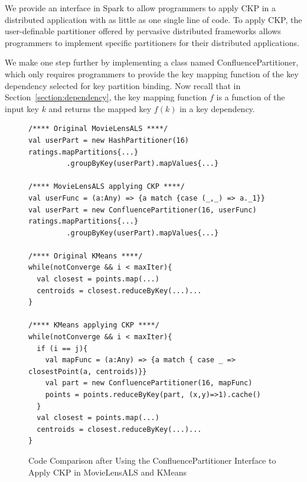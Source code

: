 \documentclass[10pt,journal,compsoc]{IEEEtran}
\makeatletter
\newcommand{\removelatexerror}{\let\@latex@error\@gobble}
\makeatother
\begin{document}
We provide an interface in Spark to allow programmers to apply CKP in a
distributed application with as little as one single line of code.
To apply CKP, the user-definable partitioner offered by pervasive distributed frameworks allows programmers to implement specific partitioners for their distributed applications. 

We make one step further by implementing a class named ConfluencePartitioner, 
which only requires programmers to provide the key mapping function 
of the key dependency selected for key partition binding. 
Now recall that in Section~\ref{section:dependency}, the key mapping function
$f$ is a function of the input key $k$ and returns the mapped key $f(k)$ in a 
key dependency.


\begin{figure}[!t]
\removelatexerror
\begin{lstlisting}
/**** Original MovieLensALS ****/
val userPart = new HashPartitioner(16)
ratings.mapPartitions{...}
         .groupByKey(userPart).mapValues{...}

/**** MovieLensALS applying CKP ****/
val userFunc = (a:Any) => {a match {case (_,_) => a._1}}
val userPart = new ConfluencePartitioner(16, userFunc)
ratings.mapPartitions{...}
         .groupByKey(userPart).mapValues{...}

/**** Original KMeans ****/
while(notConverge && i < maxIter){
  val closest = points.map(...)
  centroids = closest.reduceByKey(...)...
}

/**** KMeans applying CKP ****/
while(notConverge && i < maxIter){
  if (i == j){
    val mapFunc = (a:Any) => {a match { case _ => closestPoint(a, centroids)}}
    val part = new ConfluencePartitioner(16, mapFunc)
    points = points.reduceByKey(part, (x,y)=>1).cache()
  }
  val closest = points.map(...)
  centroids = closest.reduceByKey(...)...
}

\end{lstlisting}
\caption{Code Comparison after Using the ConfluencePartitioner Interface to Apply CKP in MovieLensALS and KMeans}
\label{fig:code}
\end{figure}
\end{document}
